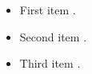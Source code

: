 \documentclass[english,edition=2026]{zpiday}
\begin{document}

\begin{itemize}
    \item First item \cite{vinson2002multiple}.
    \item Second item \cite{wei2020toward}.
    \item Third item \cite{xie2021segformer}.
\end{itemize}




\end{document}
